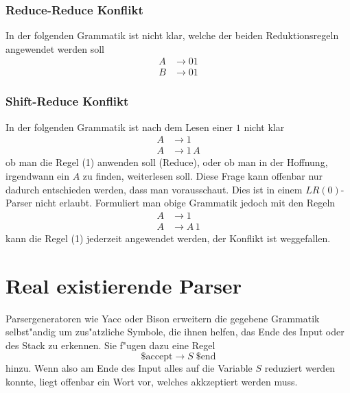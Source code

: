 \subsubsection{Reduce-Reduce Konflikt}
In der folgenden Grammatik ist nicht klar, welche der beiden Reduktionsregeln
angewendet werden soll
\begin{align*}
A&\rightarrow 01\\
B&\rightarrow 01
\end{align*}

\subsubsection{Shift-Reduce Konflikt}
In der folgenden Grammatik ist nach dem Lesen einer $1$ nicht klar
\begin{align*}
A&\rightarrow 1\tag{1}\\
A&\rightarrow 1\,A\tag{2}
\end{align*}
ob man die Regel (1) anwenden soll (Reduce), oder ob man
in der Hoffnung, irgendwann ein $A$ zu finden, weiterlesen
soll. Diese Frage kann offenbar nur dadurch entschieden werden, dass
man vorausschaut. Dies ist in einem $LR(0)$-Parser nicht erlaubt.
Formuliert man obige Grammatik jedoch mit den Regeln
\begin{align*}
A&\rightarrow 1\tag{1}\\
A&\rightarrow A\,1\tag{2}
\end{align*}
kann die Regel (1) jederzeit angewendet werden, der Konflikt ist
weggefallen. 

\section{Real existierende Parser}
Parsergeneratoren wie Yacc oder Bison erweitern die gegebene Grammatik
selb\-st"andig um zus"atzliche Symbole, die ihnen helfen, das Ende
des Input oder des Stack zu erkennen. Sie f"ugen dazu eine
Regel
\[
\text{\$accept}\rightarrow S\; \text{\$end}
\]
hinzu. Wenn also am Ende des Input alles auf die Variable $S$ reduziert
werden konnte, liegt offenbar ein Wort vor, welches akkzeptiert werden
muss.

